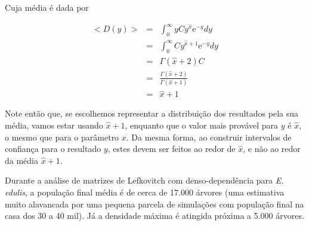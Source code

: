 \documentclass[12pt,a4paper]{article}
\begin{document}
Cuja m\'edia \'e dada por

\begin{eqnarray*}
	<D(y)> & = & \int_0^\infty y C y^{\hat x} \mathrm{e}^{-y} dy \\
	       & = & \int_0^\infty C y^{\hat x+1} \mathrm{e}^{-y} dy \\
		   & = & \Gamma(\hat x +2) C\\
	       & = & \frac{\Gamma(\hat x +2)}{\Gamma(\hat x + 1)} \\
		   & = & \hat x + 1
\end{eqnarray*}

Note ent\~ao que, se escolhemos representar a distribui\c c\~ao dos resultados pela sua m\'edia,
vamos estar usando $\hat x + 1$, enquanto que o valor mais prov\'avel para $y$ \'e $\hat x$, o mesmo
que para o par\^ametro $x$. Da mesma forma, ao construir intervalos de confian\c ca para o resultado
$y$, estes devem ser feitos ao redor de $\hat x$, e n\~ao ao redor da m\'edia $\hat x + 1$. 

Durante a an\'alise de matrizes de Lefkovitch com denso-depend\^encia para
{\em E. edulis}, a popula\c c\~ao final m\'edia \'e de cerca de 17.000 \'arvores (uma estimativa
muito alavancada por uma pequena parcela de simula\c c\~oes com popula\c c\~ao final na casa dos 30 a 40 mil).
J\'a a densidade m\'axima \'e atingida pr\'oxima a 5.000 \'arvores.
\end{document}
